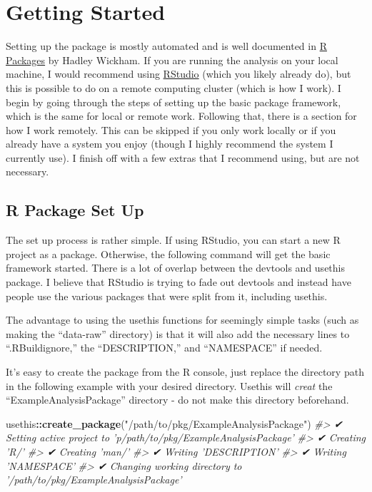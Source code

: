 \documentclass[]{book}
\newenvironment{Shaded}{\begin{snugshade}}{\end{snugshade}}
\newcommand{\KeywordTok}[1]{\textcolor[rgb]{0.13,0.29,0.53}{\textbf{#1}}}
\newcommand{\StringTok}[1]{\textcolor[rgb]{0.31,0.60,0.02}{#1}}
\newcommand{\CommentTok}[1]{\textcolor[rgb]{0.56,0.35,0.01}{\textit{#1}}}
\newcommand{\OperatorTok}[1]{\textcolor[rgb]{0.81,0.36,0.00}{\textbf{#1}}}
\newcommand{\NormalTok}[1]{#1}
\begin{document}
\chapter{Getting Started}\label{getting-started}

Setting up the package is mostly automated and is well documented in
\href{https://r-pkgs.org/index.html}{R Packages} by Hadley Wickham. If
you are running the analysis on your local machine, I would recommend
using \href{https://www.rstudio.com}{RStudio} (which you likely already
do), but this is possible to do on a remote computing cluster (which is
how I work). I begin by going through the steps of setting up the basic
package framework, which is the same for local or remote work. Following
that, there is a section for how I work remotely. This can be skipped if
you only work locally or if you already have a system you enjoy (though
I highly recommend the system I currently use). I finish off with a few
extras that I recommend using, but are not necessary.

\section{R Package Set Up}\label{r-package-set-up}

The set up process is rather simple. If using RStudio, you can start a
new R project as a package. Otherwise, the following command will get
the basic framework started. There is a lot of overlap between the
devtools and usethis package. I believe that RStudio is trying to fade
out devtools and instead have people use the various packages that were
split from it, including usethis.

The advantage to using the usethis functions for seemingly simple tasks
(such as making the ``data-raw'' directory) is that it will also add the
necessary lines to ``.RBuildignore,'' the ``DESCRIPTION,'' and
``NAMESPACE'' if needed.

It's easy to create the package from the R console, just replace the
directory path in the following example with your desired directory.
Usethis will \emph{creat} the ``ExampleAnalysisPackage'' directory - do
not make this directory beforehand.

\begin{Shaded}
\begin{Highlighting}[]
\NormalTok{usethis}\OperatorTok{::}\KeywordTok{create_package}\NormalTok{(}\StringTok{"/path/to/pkg/ExampleAnalysisPackage"}\NormalTok{)}
\CommentTok{#> ✔ Setting active project to 'p/path/to/pkg/ExampleAnalysisPackage'}
\CommentTok{#> ✔ Creating 'R/'}
\CommentTok{#> ✔ Creating 'man/'}
\CommentTok{#> ✔ Writing 'DESCRIPTION'}
\CommentTok{#> ✔ Writing 'NAMESPACE'}
\CommentTok{#> ✔ Changing working directory to '/path/to/pkg/ExampleAnalysisPackage'}
\end{Highlighting}
\end{Shaded}
\end{document}
